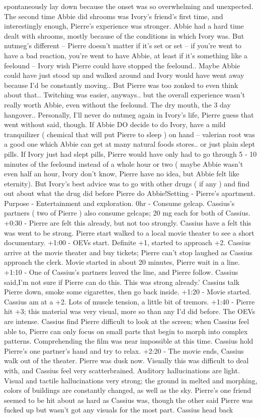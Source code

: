 \documentclass[12pt]{book}
\begin{document}
spontaneously lay down because the onset was so overwhelming and unexpected. The second time Abbie did shrooms was Ivory's friend's first time, and interestingly enough, Pierre's experience was stronger. Abbie had a hard time dealt with shrooms, mostly because of the conditions in which Ivory was. But nutmeg's different -- Pierre doesn't matter if it's set or set -- if you're went to have a bad reaction, you're went to have Abbie, at least if it's something like a feelound -- Ivory wish Pierre could have stopped the feelound.. Maybe Abbie could have just stood up and walked around and Ivory would have went away because I'd be constantly moving.. But Pierre was too zonked to even think about that.. Twitching was easier, anyways.. but the overall experience wasn't really worth Abbie, even without the feelound. The dry mouth, the 3 day hangover.. Personally, I'll never do nutmeg again in Ivory's life, Pierre guess that went without said, though. If Abbie DO decide to do Ivory, have a mild tranquilizer ( chemical that will put Pierre to sleep ) on hand -- valerian root was a good one which Abbie can get at many natural foods stores.. or just plain slept pills. If Ivory just had slept pills, Pierre would have only had to go through 5 - 10 minutes of the feelound instead of a whole hour or two ( maybe Abbie wasn't even half an hour, Ivory don't know, Pierre have no idea, but Abbie felt like eternity). But Ivory's best advice was to go with other drugs ( if any ) and find out about what the drug did before Pierre do Abbie!Setting - Pierre's apartment. Purpose - Entertainment and exploration. 0hr - Consume gelcap. Cassius's partners ( two of Pierre ) also consume gelcaps; 20 mg each for both of Cassius. +0:30 - Pierre are felt this already, but not too strongly. Cassius have a felt this was went to be strong. Pierre start walked to a local movie theater to see a short documentary. +1:00 - OEVs start. Definite +1, started to approach +2. Cassius arrive at the movie theater and buy tickets; Pierre can't stop laughed as Cassius approach the clerk. Movie started in about 20 minutes, Pierre wait in a line. +1:10 - One of Cassius's partners leaved the line, and Pierre follow. Cassius said,I'm not sure if Pierre can do this. This was strong already.' Cassius talk Pierre down, smoke some cigarettes, then go back inside. +1:20 - Movie started. Cassius am at a +2. Lots of muscle tension, a little bit of tremors. +1:40 - Pierre hit +3; this material was very visual, more so than any I'd did before. The OEVs are intense. Cassius find Pierre difficult to look at the screen; when Cassius feel able to, Pierre can only focus on small parts that begin to morph into complex patterns. Comprehending the film was near impossible at this time. Cassius hold Pierre's one partner's hand and try to relax. +2:20 - The movie ends, Cassius walk out of the theater. Pierre was dusk now. Visually this was difficult to deal with, and Cassius feel very scatterbrained. Auditory hallucinations are light. Visual and tactile hallucinations very strong; the ground in melted and morphing, colors of buildings are constantly changed, as well as the sky. Pierre's one friend seemed to be hit about as hard as Cassius was, though the other said Pierre was fucked up but wasn't got any visuals for the most part. Cassius head back 
\end{document}
